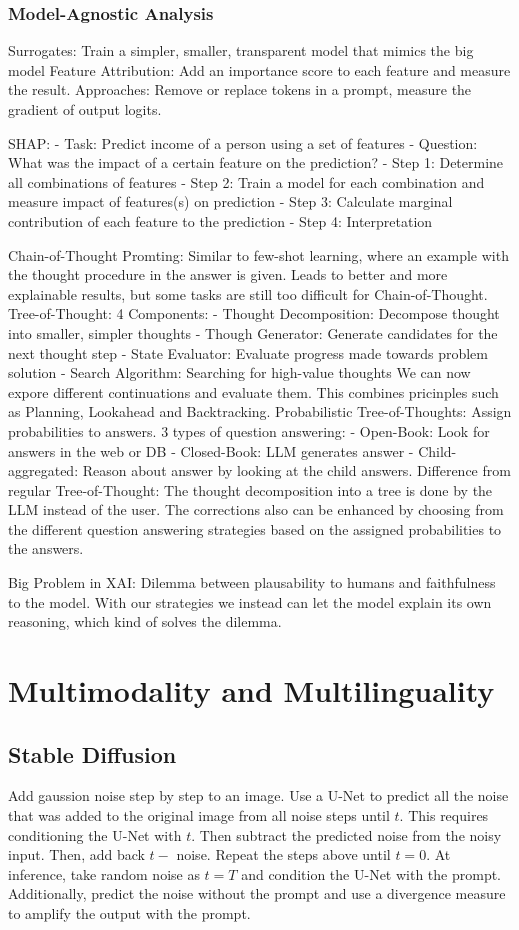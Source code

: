 \documentclass{scrartcl}
\begin{document}
\subsubsection*{Model-Agnostic Analysis}
Surrogates: Train a simpler, smaller, transparent model that mimics the big model
Feature Attribution: Add an importance score to each feature and measure the result. Approaches: Remove or replace tokens in a prompt, measure the gradient of output logits.

SHAP:
- Task: Predict income of a person using a set of features
- Question: What was the impact of a certain feature on the prediction?
- Step 1: Determine all combinations of features
- Step 2: Train a model for each combination and measure impact of features(s) on prediction
- Step 3: Calculate marginal contribution of each feature to the prediction
- Step 4: Interpretation

Chain-of-Thought Promting:
Similar to few-shot learning, where an example with the thought procedure in the answer is given. Leads to better and more explainable results, but some tasks are still too difficult for Chain-of-Thought.
Tree-of-Thought:
4 Components:
- Thought Decomposition: Decompose thought into smaller, simpler thoughts
- Though Generator: Generate candidates for the next thought step
- State Evaluator: Evaluate progress made towards problem solution
- Search Algorithm: Searching for high-value thoughts
We can now expore different continuations and evaluate them. This combines pricinples such as Planning, Lookahead and Backtracking.
Probabilistic Tree-of-Thoughts: Assign probabilities to answers.
3 types of question answering:
- Open-Book: Look for answers in the web or DB
- Closed-Book: LLM generates answer
- Child-aggregated: Reason about answer by looking at the child answers.
Difference from regular Tree-of-Thought: The thought decomposition into a tree is done by the LLM instead of the user. The corrections also can be enhanced by choosing from the different question answering strategies based on the assigned probabilities to the answers.

Big Problem in XAI:
Dilemma between plausability to humans and faithfulness to the model. With our strategies we instead can let the model explain its own reasoning, which kind of solves the dilemma.


\section*{Multimodality and Multilinguality}
\subsection*{Stable Diffusion}
Add gaussion noise step by step to an image.
Use a U-Net to predict all the noise that was added to the original image from all noise steps until $t$. This requires conditioning the U-Net with $t$.
Then subtract the predicted noise from the noisy input.
Then, add back $t-$ noise.
Repeat the steps above until $t = 0$.
At inference, take random noise as $t = T$ and condition the U-Net with the prompt. Additionally, predict the noise without the prompt and use a divergence measure to amplify the output with the prompt.
\end{document}
